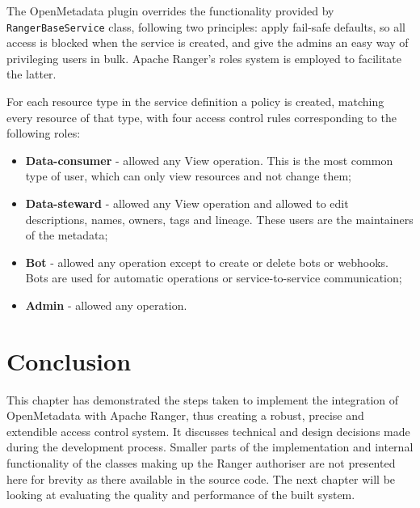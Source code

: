 The OpenMetadata plugin overrides the functionality provided by \texttt{RangerBaseService} class, following two principles: apply fail-safe defaults, so all access is blocked when the service is created, and give the admins an easy way of privileging users in bulk. Apache Ranger's roles system is employed to facilitate the latter.

For each resource type in the service definition a policy is created, matching every resource of that type, with four access control rules corresponding to the following roles:
\begin{itemize}
    \item \textbf{Data-consumer} - allowed any View operation. This is the most common type of user, which can only view resources and not change them;
    \item \textbf{Data-steward} - allowed any View operation and allowed to edit descriptions, names, owners, tags and lineage. These users are the maintainers of the metadata;
    \item \textbf{Bot} - allowed any operation except to create or delete bots or webhooks. Bots are used for automatic operations or service-to-service communication;
    \item \textbf{Admin} - allowed any operation.
\end{itemize}

\section{Conclusion}

This chapter has demonstrated the steps taken to implement the integration of OpenMetadata with Apache Ranger, thus creating a robust, precise and extendible access control system. It discusses technical and design decisions made during the development process. Smaller parts of the implementation and internal functionality of the classes making up the Ranger authoriser are not presented here for brevity as there available in the source code. The next chapter will be looking at evaluating the quality and performance of the built system. 